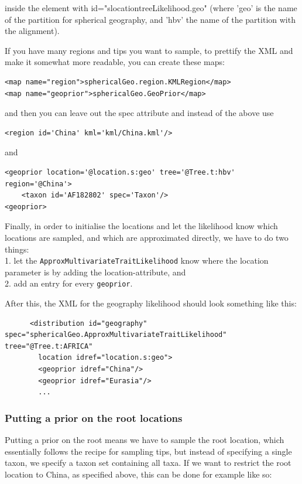 \documentclass{article}
\begin{document}
inside the element with id="slocationtreeLikelihood.geo" (where 'geo' is the name of the partition for spherical geography, and 'hbv' the name of the partition with the alignment).


If you have many regions and tips you want to sample, to prettify the XML and make it somewhat more readable, you can create these maps:

\begin{verbatim}
<map name="region">sphericalGeo.region.KMLRegion</map>
<map name="geoprior">sphericalGeo.GeoPrior</map>
\end{verbatim}

and then you can leave out the spec attribute and instead of the above use

\begin{verbatim}
<region id='China' kml='kml/China.kml'/>
\end{verbatim}

and 

\begin{verbatim}
<geoprior location='@location.s:geo' tree='@Tree.t:hbv' region='@China'>
	<taxon id='AF182802' spec='Taxon'/>
<geoprior>
\end{verbatim}



Finally, in order to initialise the locations and let the likelihood know which locations are sampled, and which are approximated directly, we have to do two things:\\
1. let the {\tt ApproxMultivariateTraitLikelihood} know where the location parameter is by adding the location-attribute, and\\
2. add an entry for every {\tt geoprior}.

After this, the XML for the geography likelihood should look something like this:

\begin{verbatim}
      <distribution id="geography" spec="sphericalGeo.ApproxMultivariateTraitLikelihood" tree="@Tree.t:AFRICA" 
		location idref="location.s:geo">
        <geoprior idref="China"/>
        <geoprior idref="Eurasia"/>
        ...
\end{verbatim}


\subsubsection*{Putting a prior on the root locations}

Putting a prior on the root means we have to sample the root location, which essentially follows the recipe for sampling tips, but instead of specifying a single taxon, we specify a taxon set containing all taxa. If we want to restrict the root location to China, as specified above, this can be done for example like so:
\end{document}
